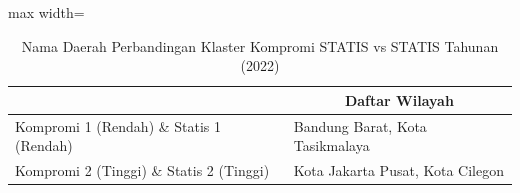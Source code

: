 \begin{table}[H]
\centering
\caption{Nama Daerah Perbandingan Klaster Kompromi STATIS vs STATIS Tahunan (2022)} \label{tab:sample1comp_statis_name_2022}
\begin{adjustbox}{max width=\textwidth}
\begin{tabular}{|>{\centering\arraybackslash}p{4cm}|p{10cm}|}
\hline
\multicolumn{1}{|c|}{\textbf{Kategori}} & \multicolumn{1}{c|}{\textbf{Daftar Wilayah}} \\
\hline
Kompromi 1 (Rendah) \& Statis 1 (Rendah) & Bandung Barat, Kota Tasikmalaya \\
\hline
Kompromi 2 (Tinggi) \& Statis 2 (Tinggi) & Kota Jakarta Pusat, Kota Cilegon \\
\hline
\end{tabular}
\end{adjustbox}
\end{table}